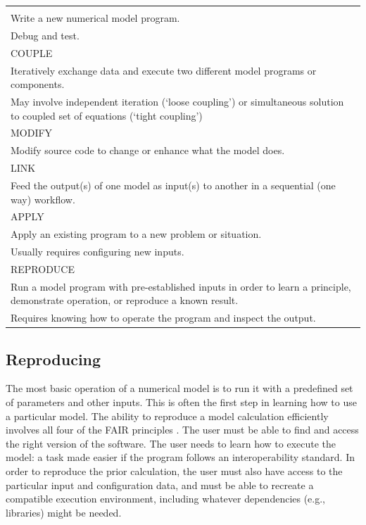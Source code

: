 \documentclass[12pt]{amsart}
\begin{document}
\begin{table}[htbp]
   \centering
   \begin{tabular}{>{\centering\arraybackslash}p{6in}} %
      \toprule
      {\centering BUILD} \\
      Write a new numerical model program.\\
      Debug and test.\\
      \midrule
      COUPLE \\
      Iteratively exchange data and execute two different model programs or components. \\
      May involve independent iteration (`loose coupling') or simultaneous solution to coupled set of equations (`tight coupling') \\
      \midrule
      MODIFY \\
      Modify source code to change or enhance what the model does. \\
      \midrule
      LINK \\
      Feed the output(s) of one model as input(s) to another in a sequential (one way) workflow.\\
      \midrule
      APPLY \\
      Apply an existing program to a new problem or situation.\\
      Usually requires configuring new inputs.\\
      \midrule
      REPRODUCE \\
      Run a model program with pre-established inputs in order to learn a principle, demonstrate operation, or reproduce a known result.\\
      Requires knowing how to operate the program and inspect the output.\\
      \bottomrule
   \end{tabular}
   \label{tab:taxonomy}
\end{table}

\subsection{Reproducing}

The most basic operation of a numerical model is to run it with a predefined set of parameters and other inputs. This is often the first step in learning how to use a particular model. The ability to reproduce a model calculation efficiently involves all four of the FAIR principles \citep{wilkinson2016fair}. The user must be able to find and access the right version of the software. The user needs to learn how to execute the model: a task made easier if the program follows an interoperability standard. In order to reproduce the prior calculation, the user must also have access to the particular input and configuration data, and must be able to recreate a compatible execution environment, including whatever dependencies (e.g., libraries) might be needed.
\end{document}
